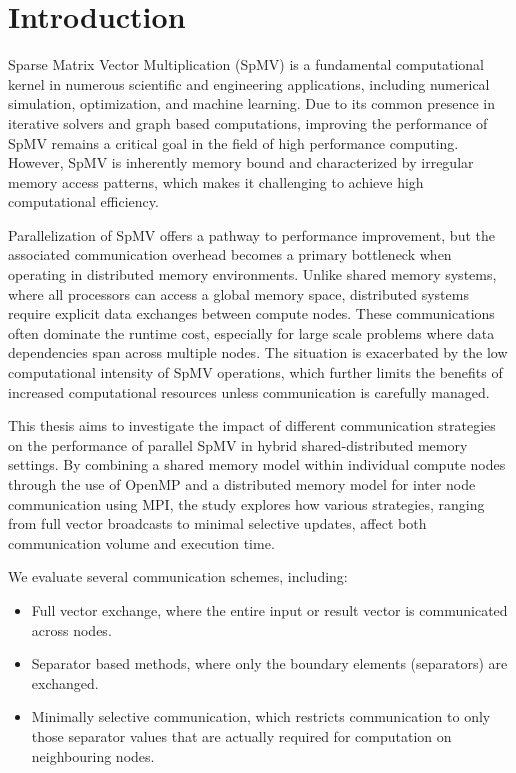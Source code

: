 \chapter{Introduction}
Sparse Matrix Vector Multiplication (SpMV) is a fundamental computational kernel in numerous scientific and engineering applications, including numerical simulation, optimization, and machine learning. Due to its common presence in iterative solvers and graph based computations, improving the performance of SpMV remains a critical goal in the field of high performance computing. However, SpMV is inherently memory bound and characterized by irregular memory access patterns, which makes it challenging to achieve high computational efficiency. 
\medskip

Parallelization of SpMV offers a pathway to performance improvement, but the associated communication overhead becomes a primary bottleneck when operating in distributed memory environments. Unlike shared memory systems, where all processors can access a global memory space, distributed systems require explicit data exchanges between compute nodes. These communications often dominate the runtime cost, especially for large scale problems where data dependencies span across multiple nodes. The situation is exacerbated by the low computational intensity of SpMV operations, which further limits the benefits of increased computational resources unless communication is carefully managed.
\medskip


This thesis aims to investigate the impact of different communication strategies on the performance of parallel SpMV in hybrid shared-distributed memory settings. By combining a shared memory model within individual compute nodes through the use of OpenMP and a distributed memory model for inter node communication using MPI, the study explores how various strategies, ranging from full vector broadcasts to minimal selective updates, affect both communication volume and execution time.
\medskip

We evaluate several communication schemes, including:

\begin{itemize}
    \item Full vector exchange, where the entire input or result vector is communicated across nodes.

    \item Separator based methods, where only the boundary elements (separators) are exchanged.

    \item Minimally selective communication, which restricts communication to only those separator values that are actually required for computation on neighbouring nodes.
\end{itemize}
\medskip

